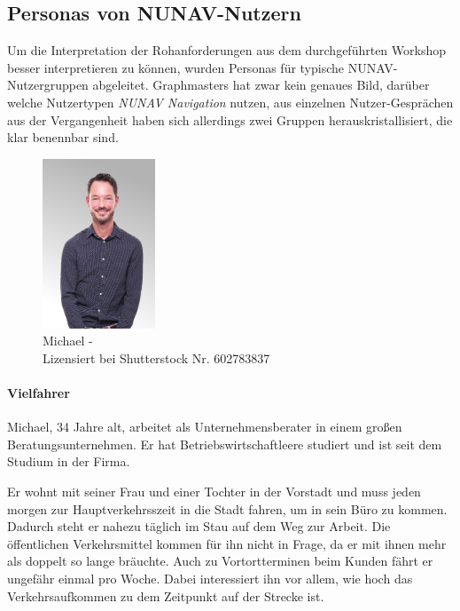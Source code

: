 \subsection{Personas von NUNAV-Nutzern}
\label{sec:06_model_evaluation:personas}

Um die Interpretation der Rohanforderungen aus dem durchgeführten Workshop besser interpretieren zu können, wurden Personas für typische NUNAV-Nutzergruppen abgeleitet. Graphmasters hat zwar kein genaues Bild, darüber welche Nutzertypen \textit{NUNAV Navigation} nutzen, aus einzelnen Nutzer-Gesprächen aus der Vergangenheit haben sich allerdings zwei Gruppen herauskristallisiert, die klar benennbar sind.

\begin{figure}
    \vspace{-\intextsep}
    \centering
    \includegraphics[width=0.3\textwidth]{contents/06_model_evaluation/01_integration/res/persona_picture_michael.png}
    \caption{Michael -\\Lizensiert bei Shutterstock Nr. 602783837}
\end{figure}

\paragraph{Vielfahrer} Michael, 34 Jahre alt, arbeitet als Unternehmensberater in einem großen Beratungsunternehmen. Er hat Betriebswirtschaftleere studiert und ist seit dem Studium in der Firma.

Er wohnt mit seiner Frau und einer Tochter in der Vorstadt und muss jeden morgen zur Hauptverkehrsszeit in die Stadt fahren, um in sein Büro zu kommen. Dadurch steht er nahezu täglich im Stau auf dem Weg zur Arbeit. Die öffentlichen Verkehrsmittel kommen für ihn nicht in Frage, da er mit ihnen mehr als doppelt so lange bräuchte. Auch zu Vortortterminen beim Kunden fährt er ungefähr einmal pro Woche. Dabei interessiert ihn vor allem, wie hoch das Verkehrsaufkommen zu dem Zeitpunkt auf der Strecke ist.


